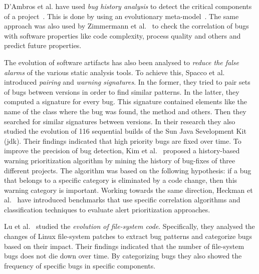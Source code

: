 \documentclass[conference]{llncs}
\begin{document}
D'Ambros et al. have used {\it bug history analysis} to detect
the critical components of a project~\cite{D08}. This is done by using an
evolutionary meta-model~\cite{DL08}. The same approach was
also used by Zimmermann et al.~\cite{ZNA08} to check the correlation
of bugs with software properties like code complexity, process quality and others
and predict future properties.

The evolution of software artifacts has also been analysed to {\it reduce the false
alarms} of the various static analysis tools. To achieve this, Spacco et
al.~\cite{SHP06} introduced {\it pairing} and {\it warning signatures}. In the
former, they tried to pair sets of bugs between versions in order to find
similar patterns. In the latter, they computed a signature for every bug. This
signature contained elements like the name of the class where the bug was found,
the method and others. Then they searched for similar signatures between
versions. In their research they also studied the evolution of 116 sequential
builds of the Sun Java Sevelopment Kit ({\sc jdk}). Their findings indicated that
high priority bugs are fixed over time. To improve the precision of bug
detection, Kim et al.~\cite{KE07b}\cite{KE07} proposed a history-based warning
prioritization algorithm by mining the history of bug-fixes of three
different projects. The algorithm was based on the following hypothesis: if a
bug that belongs to a specific category is eliminated by a code change, then
this warning category is important. Working towards the same direction, Heckman
et al.~\cite{HW09}\cite{HW08} have introduced benchmarks that use specific
correlation algorithms and classification techniques to evaluate alert
prioritization approaches.

Lu et al.~\cite{LAAL13} studied the {\it evolution of file-system code}.
Specifically, they analysed the changes of Linux file-system patches to extract
bug patterns and categorize bugs based on their impact. Their findings
indicated that the number of file-system bugs does not die down over time. By
categorizing bugs they also showed the frequency of specific bugs in specific
components.
\end{document}
